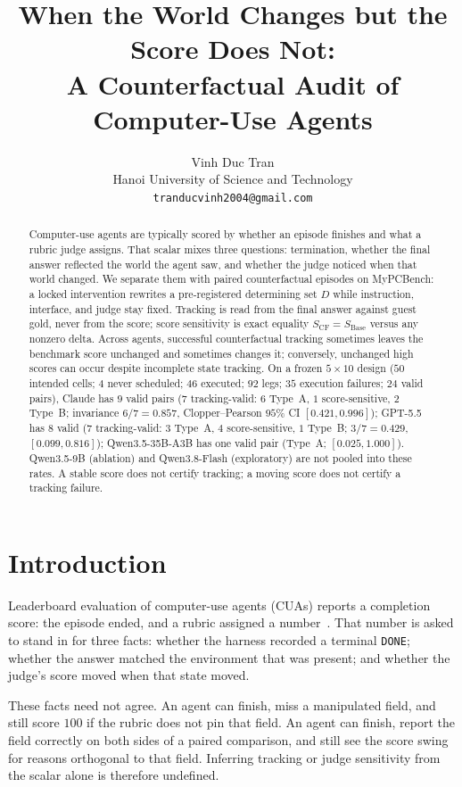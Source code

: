 \documentclass{article}
\title{When the World Changes but the Score Does Not:\\
A Counterfactual Audit of Computer-Use Agents}
\author{%
Vinh Duc Tran \\
Hanoi University of Science and Technology \\
\texttt{tranducvinh2004@gmail.com}%
}
\begin{document}
\maketitle

\begin{abstract}
Computer-use agents are typically scored by whether an episode finishes and what a rubric judge assigns.
That scalar mixes three questions: termination, whether the final answer reflected the world the agent saw, and whether the judge noticed when that world changed.
We separate them with paired counterfactual episodes on MyPCBench: a locked intervention rewrites a pre-registered determining set $D$ while instruction, interface, and judge stay fixed.
Tracking is read from the final answer against guest gold, never from the score; score sensitivity is exact equality $S_{\mathrm{CF}}=S_{\mathrm{Base}}$ versus any nonzero delta.
Across agents, successful counterfactual tracking sometimes leaves the benchmark score unchanged and sometimes changes it; conversely, unchanged high scores can occur despite incomplete state tracking.
On a frozen $5{\times}10$ design ($50$ intended cells; $4$ never scheduled; $46$ executed; $92$ legs; $35$ execution failures; $24$ valid pairs), Claude has $9$ valid pairs ($7$ tracking-valid: $6$ Type~A, $1$ score-sensitive, $2$ Type~B; invariance $6/7=0.857$, Clopper--Pearson $95\%$ CI $[0.421,0.996]$); GPT-5.5 has $8$ valid ($7$ tracking-valid: $3$ Type~A, $4$ score-sensitive, $1$ Type~B; $3/7=0.429$, $[0.099,0.816]$); Qwen3.5-35B-A3B has one valid pair (Type~A; $[0.025,1.000]$).
Qwen3.5-9B (ablation) and Qwen3.8-Flash (exploratory) are not pooled into these rates.
A stable score does not certify tracking; a moving score does not certify a tracking failure.
\end{abstract}

\section{Introduction}

Leaderboard evaluation of computer-use agents (CUAs) reports a completion score: the episode ended, and a rubric assigned a number~\citep{jang2026mypcbench,xie2024osworld}.
That number is asked to stand in for three facts: whether the harness recorded a terminal \texttt{DONE}; whether the answer matched the environment that was present; and whether the judge's score moved when that state moved.

These facts need not agree.
An agent can finish, miss a manipulated field, and still score $100$ if the rubric does not pin that field.
An agent can finish, report the field correctly on both sides of a paired comparison, and still see the score swing for reasons orthogonal to that field.
Inferring tracking or judge sensitivity from the scalar alone is therefore undefined.
\end{document}
